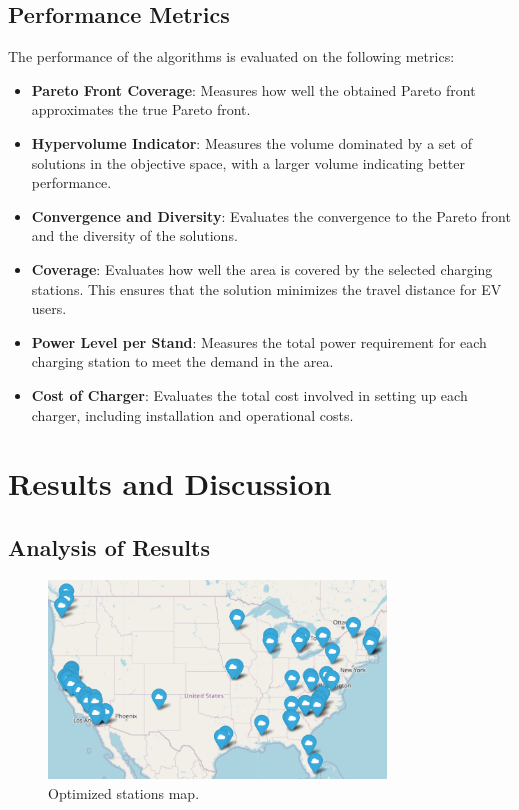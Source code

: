 \documentclass[12pt]{report}
\begin{document}
\section{Performance Metrics}
The performance of the algorithms is evaluated on the following metrics:
\begin{itemize}
    \item \textbf{Pareto Front Coverage}: Measures how well the obtained Pareto front approximates the true Pareto front.
    \item \textbf{Hypervolume Indicator}: Measures the volume dominated by a set of solutions in the objective space, with a larger volume indicating better performance.
    \item \textbf{Convergence and Diversity}: Evaluates the convergence to the Pareto front and the diversity of the solutions.
    \item \textbf{Coverage}: Evaluates how well the area is covered by the selected charging stations. This ensures that the solution minimizes the travel distance for EV users.
    \item \textbf{Power Level per Stand}: Measures the total power requirement for each charging station to meet the demand in the area.
    \item \textbf{Cost of Charger}: Evaluates the total cost involved in setting up each charger, including installation and operational costs.
\end{itemize}

\chapter{Results and Discussion}


\section{Analysis of Results}

\begin{figure}[h!]
    \centering
    \includegraphics[width=0.8\textwidth]{Figures/optimized_map.PNG}
    \caption{Optimized stations map.}
    \label{fig:original_map}
\end{figure}
\end{document}
